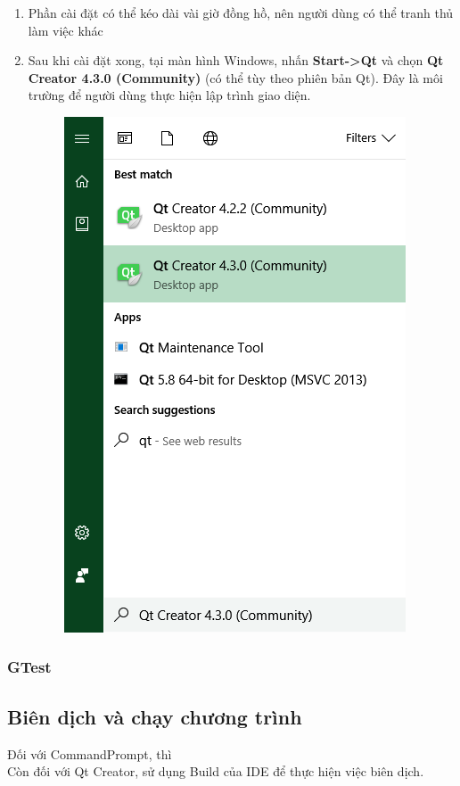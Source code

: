 \documentclass[12pt,a4paper]{report}
\begin{document}
\begin{enumerate}
\begin{figure}[H]
				\end{figure}
				\item Phần cài đặt có thể kéo dài vài giờ đồng hồ, nên người dùng có thể tranh thủ làm việc khác
				\item Sau khi cài đặt xong, tại màn hình Windows, nhấn \textbf{Start->Qt} và chọn \textbf{Qt Creator 4.3.0 (Community)} (có thể tùy theo phiên bản Qt). Đây là môi trường để người dùng thực hiện lập trình giao diện.
				\begin{figure}[H]
					\centering
					\label{F:qtstep7}
					\includegraphics[scale = 1]{Qtstep7.png}
				\end{figure}
			\end{enumerate}
			\subsubsection{GTest}
		\subsection{Biên dịch và chạy chương trình}
		Đối với CommandPrompt, thì \\%
		Còn đối với Qt Creator, sử dụng Build của IDE để thực hiện việc biên dịch.
\end{document}
